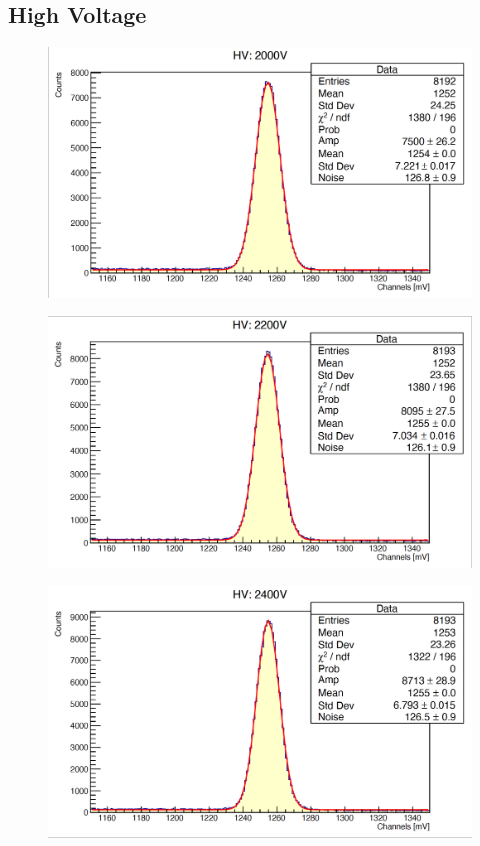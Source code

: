 \documentclass[a4paper,10pt]{article}
\begin{document}
\subsection{High Voltage}
\begin{figure}[H]
    \centering
    \includegraphics[scale=0.45]{appendice/2000}
\end{figure}
\begin{figure}[H]
    \centering
    \includegraphics[scale=0.45]{appendice/2200}
\end{figure}
\begin{figure}[H]
    \centering
    \includegraphics[scale=0.45]{appendice/2400}
\end{figure}
\end{document}
